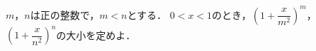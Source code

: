 \documentclass[../../main.tex]{subfiles}
\begin{document}
$m$，$n$は正の整数で，$m<n$とする．
$0<x<1$のとき，$\displaystyle{\left( 1+\dfrac{x}{m^2} \right)}^m$，
$\displaystyle{\left( 1+\dfrac{x}{n^2} \right)}^n$の大小を定めよ．
\end{document}
